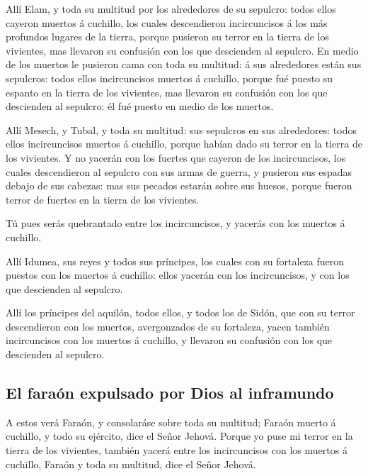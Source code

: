  Allí Elam, y toda su multitud por los alrededores de su
sepulcro: todos ellos cayeron muertos á cuchillo, los cuales
descendieron incircuncisos á los más profundos lugares de la tierra,
porque pusieron su terror en la tierra de los vivientes, mas llevaron su
confusión con los que descienden al sepulcro.  En medio de
los muertos le pusieron cama con toda su multitud: á sus alrededores
están sus sepulcros: todos ellos incircuncisos muertos á cuchillo,
porque fué puesto su espanto en la tierra de los vivientes, mas llevaron
su confusión con los que descienden al sepulcro: él fué puesto en medio
de los muertos.

 Allí Mesech, y Tubal, y toda su multitud: sus sepulcros en
sus alrededores: todos ellos incircuncisos muertos á cuchillo, porque
habían dado su terror en la tierra de los vivientes.  Y no
yacerán con los fuertes que cayeron de los incircuncisos, los cuales
descendieron al sepulcro con sus armas de guerra, y pusieron sus espadas
debajo de sus cabezas: mas sus pecados estarán sobre sus huesos, porque
fueron terror de fuertes en la tierra de los vivientes.

 Tú pues serás quebrantado entre los incircuncisos, y
yacerás con los muertos á cuchillo.

 Allí Idumea, sus reyes y todos sus príncipes, los cuales
con su fortaleza fueron puestos con los muertos á cuchillo: ellos
yacerán con los incircuncisos, y con los que descienden al sepulcro.

 Allí los príncipes del aquilón, todos ellos, y todos los
de Sidón, que con su terror descendieron con los muertos, avergonzados
de su fortaleza, yacen también incircuncisos con los muertos á cuchillo,
y llevaron su confusión con los que descienden al sepulcro.

\hypertarget{el-farauxf3n-expulsado-por-dios-al-inframundo}{%
\subsection{El faraón expulsado por Dios al
inframundo}\label{el-farauxf3n-expulsado-por-dios-al-inframundo}}

 A estos verá Faraón, y consolaráse sobre toda su multitud;
Faraón muerto á cuchillo, y todo su ejército, dice el Señor Jehová.
 Porque yo puse mi terror en la tierra de los vivientes,
también yacerá entre los incircuncisos con los muertos á cuchillo,
Faraón y toda su multitud, dice el Señor Jehová.

